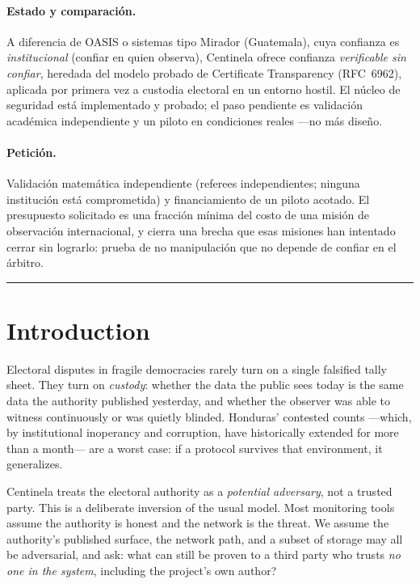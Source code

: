 \documentclass[11pt,a4paper]{article}
\theoremstyle{plain}
\theoremstyle{definition}
\theoremstyle{remark}
\begin{document}
\paragraph{Estado y comparaci\'on.} A diferencia de OASIS o sistemas tipo
Mirador (Guatemala), cuya confianza es \emph{institucional} (confiar en
quien observa), Centinela ofrece confianza \emph{verificable sin
confiar}, heredada del modelo probado de Certificate Transparency
(RFC~6962), aplicada por primera vez a custodia electoral en un entorno
hostil. El n\'ucleo de seguridad est\'a implementado y probado; el paso
pendiente es validaci\'on acad\'emica independiente y un piloto en
condiciones reales ---no m\'as dise\~no.

\paragraph{Petici\'on.} Validaci\'on matem\'atica independiente
(referees independientes; ninguna instituci\'on est\'a comprometida) y financiamiento de un piloto
acotado. El presupuesto solicitado es una fracci\'on m\'inima del costo
de una misi\'on de observaci\'on internacional, y cierra una brecha que
esas misiones han intentado cerrar sin lograrlo: prueba de no
manipulaci\'on que no depende de confiar en el \'arbitro.

\bigskip\hrule\bigskip

\tableofcontents
\newpage

\section{Introduction}

Electoral disputes in fragile democracies rarely turn on a single
falsified tally sheet. They turn on \emph{custody}: whether the data the
public sees today is the same data the authority published yesterday,
and whether the observer was able to witness continuously or was quietly
blinded. Honduras' contested counts ---which, by institutional
inoperancy and corruption, have historically extended for more than a
month--- are a worst case: if a protocol survives that environment, it
generalizes.

Centinela treats the electoral authority as a \emph{potential adversary},
not a trusted party. This is a deliberate inversion of the usual model.
Most monitoring tools assume the authority is honest and the network is
the threat. We assume the authority's published surface, the network
path, and a subset of storage may all be adversarial, and ask: what can
still be proven to a third party who trusts \emph{no one in the system},
including the project's own author?
\end{document}
